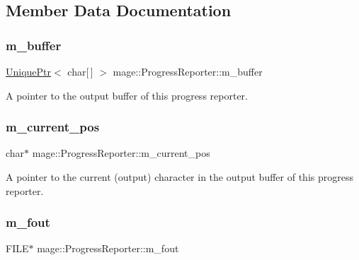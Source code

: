 \subsection{Member Data Documentation}
\hypertarget{classmage_1_1_progress_reporter_ad05a4425246e206f867d54939eeb751b}{}\label{classmage_1_1_progress_reporter_ad05a4425246e206f867d54939eeb751b} 
\subsubsection{\texorpdfstring{m\+\_\+buffer}{m\_buffer}}
{\footnotesize\ttfamily \hyperlink{namespacemage_a3316d7143a973e37adf1110f2e80ca31}{Unique\+Ptr}$<$ char\mbox{[}$\,$\mbox{]} $>$ mage\+::\+Progress\+Reporter\+::m\+\_\+buffer\hspace{0.3cm}{\ttfamily [private]}}

A pointer to the output buffer of this progress reporter. \hypertarget{classmage_1_1_progress_reporter_a7adafaaf90edf29c8c27f4008aea41c9}{}\label{classmage_1_1_progress_reporter_a7adafaaf90edf29c8c27f4008aea41c9} 
\subsubsection{\texorpdfstring{m\+\_\+current\+\_\+pos}{m\_current\_pos}}
{\footnotesize\ttfamily char$\ast$ mage\+::\+Progress\+Reporter\+::m\+\_\+current\+\_\+pos\hspace{0.3cm}{\ttfamily [private]}}

A pointer to the current (output) character in the output buffer of this progress reporter. \hypertarget{classmage_1_1_progress_reporter_ad325ee5978fd1d16a97acbe37a977982}{}\label{classmage_1_1_progress_reporter_ad325ee5978fd1d16a97acbe37a977982} 
\subsubsection{\texorpdfstring{m\+\_\+fout}{m\_fout}}
{\footnotesize\ttfamily F\+I\+LE$\ast$ mage\+::\+Progress\+Reporter\+::m\+\_\+fout\hspace{0.3cm}{\ttfamily [private]}}

